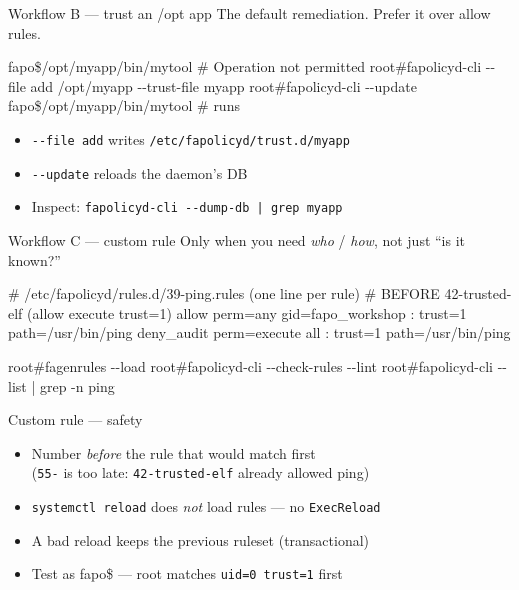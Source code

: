 \documentclass[aspectratio=169,11pt]{beamer}
\newcommand{\ok}[1]{\textcolor{allowc}{#1}}
\newcommand{\no}[1]{\textcolor{denyc}{#1}}
\newcommand{\rootp}{\textcolor{rootc}{root\#}}
\newcommand{\fapop}{\textcolor{fapoc}{fapo\$}}
\newcommand{\dd}{-{}-}
\begin{document}
\begin{frame}[fragile]{Workflow B --- trust an /opt app}
  The default remediation. Prefer it over allow rules.
  \begin{semiverbatim}
\fapop /opt/myapp/bin/mytool            # \no{Operation not permitted}
\rootp fapolicyd-cli \dd{}file add /opt/myapp \dd{}trust-file myapp
\rootp fapolicyd-cli \dd{}update
\fapop /opt/myapp/bin/mytool            # \ok{runs}
  \end{semiverbatim}
  \begin{itemize}
    \item \texttt{\dd file add} writes \texttt{/etc/fapolicyd/trust.d/myapp}
    \item \texttt{\dd update} reloads the daemon's DB
    \item Inspect: \texttt{fapolicyd-cli \dd dump-db | grep myapp}
  \end{itemize}
\end{frame}

\begin{frame}[fragile]{Workflow C --- custom rule}
  Only when you need \emph{who} / \emph{how}, not just ``is it known?''
  \begin{semiverbatim}
# /etc/fapolicyd/rules.d/39-ping.rules  (one line per rule)
# BEFORE 42-trusted-elf (allow execute trust=1)
\ok{allow} perm=any gid=fapo_workshop : trust=1 path=/usr/bin/ping
\no{deny_audit} perm=execute all : trust=1 path=/usr/bin/ping
  \end{semiverbatim}
  \begin{semiverbatim}
\rootp fagenrules \dd{}load
\rootp fapolicyd-cli \dd{}check-rules \dd{}lint
\rootp fapolicyd-cli \dd{}list | grep -n ping
  \end{semiverbatim}
\end{frame}

\begin{frame}{Custom rule --- safety}
  \begin{itemize}
    \item Number \emph{before} the rule that would match first\\
          {\small (\texttt{55-} is too late: \texttt{42-trusted-elf} already allowed ping)}
    \item \texttt{systemctl reload} does \emph{not} load rules --- no \texttt{ExecReload}
    \item A bad reload keeps the previous ruleset (transactional)
    \item Test as \fapop{} --- root matches \texttt{uid=0 trust=1} first
  \end{itemize}
\end{frame}
\end{document}
